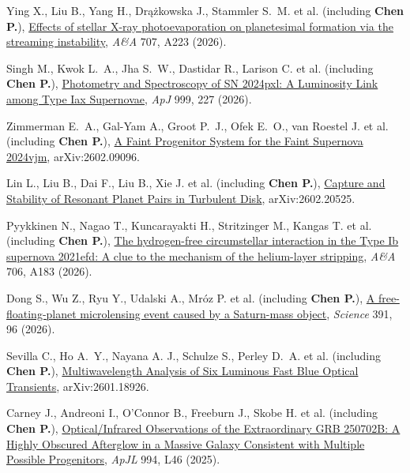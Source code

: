 \item Ying X., Liu B., Yang H., Dr{\k{a}}{\.z}kowska J., Stammler S.~M. et al. (including \textbf{Chen P.}), \href{https://ui.adsabs.harvard.edu/abs/2026A&A...707A.223Y}{Effects of stellar X-ray photoevaporation on planetesimal formation via the streaming instability}, \textit{A\&A} 707, A223 (2026).

\item Singh M., Kwok L.~A., Jha S.~W., Dastidar R., Larison C. et al. (including \textbf{Chen P.}), \href{https://ui.adsabs.harvard.edu/abs/2026ApJ...999..227S}{Photometry and Spectroscopy of SN 2024pxl: A Luminosity Link among Type Iax Supernovae}, \textit{ApJ} 999, 227 (2026).

\item Zimmerman E.~A., Gal-Yam A., Groot P.~J., Ofek E.~O., van Roestel J. et al. (including \textbf{Chen P.}), \href{https://ui.adsabs.harvard.edu/abs/2026arXiv260209096Z}{A Faint Progenitor System for the Faint Supernova 2024vjm}, arXiv:2602.09096.

\item Lin L., Liu B., Dai F., Liu B., Xie J. et al. (including \textbf{Chen P.}), \href{https://ui.adsabs.harvard.edu/abs/2026arXiv260220525L}{Capture and Stability of Resonant Planet Pairs in Turbulent Disk}, arXiv:2602.20525.

\item Pyykkinen N., Nagao T., Kuncarayakti H., Stritzinger M., Kangas T. et al. (including \textbf{Chen P.}), \href{https://ui.adsabs.harvard.edu/abs/2026A&A...706A.183P}{The hydrogen-free circumstellar interaction in the Type Ib supernova 2021efd: A clue to the mechanism of the helium-layer stripping}, \textit{A\&A} 706, A183 (2026).

\item Dong S., Wu Z., Ryu Y., Udalski A., Mr{\'o}z P. et al. (including \textbf{Chen P.}), \href{https://ui.adsabs.harvard.edu/abs/2026Sci...391...96D}{A free-floating-planet microlensing event caused by a Saturn-mass object}, \textit{Science} 391, 96 (2026).

\item Sevilla C., Ho A.~Y., Nayana A. J., Schulze S., Perley D.~A. et al. (including \textbf{Chen P.}), \href{https://ui.adsabs.harvard.edu/abs/2026arXiv260118926S}{Multiwavelength Analysis of Six Luminous Fast Blue Optical Transients}, arXiv:2601.18926.

\item Carney J., Andreoni I., O'Connor B., Freeburn J., Skobe H. et al. (including \textbf{Chen P.}), \href{https://ui.adsabs.harvard.edu/abs/2025ApJ...994L..46C}{Optical/Infrared Observations of the Extraordinary GRB 250702B: A Highly Obscured Afterglow in a Massive Galaxy Consistent with Multiple Possible Progenitors}, \textit{ApJL} 994, L46 (2025).

